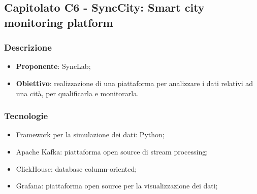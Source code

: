 \subsection{Capitolato C6 - SyncCity: Smart city monitoring platform}


\subsubsection{Descrizione}
\begin{itemize}
    \item \textbf{Proponente}: SyncLab;
    \item \textbf{Obiettivo}: realizzazione di una piattaforma per analizzare i
		dati relativi ad una cità, per qualificarla e monitorarla.
\end{itemize}


\subsubsection{Tecnologie}
\begin{itemize}
    \item Framework per la simulazione dei dati: Python;
    \item Apache Kafka: piattaforma open source di stream processing;
    \item ClickHouse: database column-oriented;
    \item Grafana: piattaforma open source per la visualizzazione dei dati;
\end{itemize}


